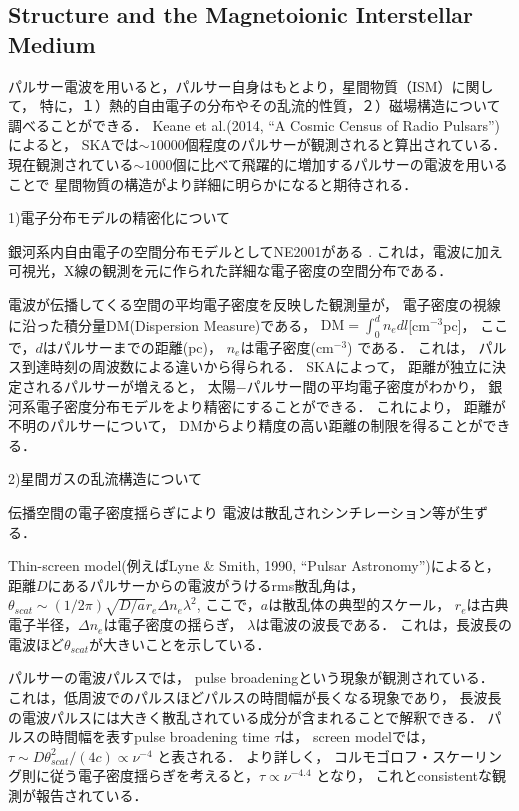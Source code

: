 \subsection{Structure and the Magnetoionic Interstellar Medium}

パルサー電波を用いると，パルサー自身はもとより，星間物質（ISM）に関して，
特に，１）熱的自由電子の分布やその乱流的性質，２）磁場構造について調べることができる．
Keane et al.(2014, ``A Cosmic Census of Radio Pulsars'')によると，
SKAでは$\sim 10000$個程度のパルサーが観測されると算出されている．
現在観測されている$\sim 1000$個に比べて飛躍的に増加するパルサーの電波を用いることで
星間物質の構造がより詳細に明らかになると期待される．

1)電子分布モデルの精密化について

銀河系内自由電子の空間分布モデルとしてNE2001がある
\cite{NE2001}.
これは，電波に加え可視光，X線の観測を元に作られた詳細な電子密度の空間分布である．

電波が伝播してくる空間の平均電子密度を反映した観測量が，
電子密度の視線に沿った積分量DM(Dispersion Measure)である，
$\textrm{DM} = \int_0^d n_e dl$[cm$^{-3}$pc]，
ここで，$d$はパルサーまでの距離(pc)，
$n_e$は電子密度(cm$^{-3}$)
である．
これは，
パルス到達時刻の周波数による違いから得られる．
SKAによって，
距離が独立に決定されるパルサーが増えると，
太陽$-$パルサー間の平均電子密度がわかり，
銀河系電子密度分布モデルをより精密にすることができる．
これにより，
距離が不明のパルサーについて，
DMからより精度の高い距離の制限を得ることができる．

2)星間ガスの乱流構造について

伝播空間の電子密度揺らぎにより
電波は散乱されシンチレーション等が生ずる．

Thin-screen model(例えばLyne \& Smith, 1990, ``Pulsar Astronomy'')によると，
距離$D$にあるパルサーからの電波がうけるrms散乱角は，
$\theta_{scat} \sim (1/2\pi) \sqrt{D/a} r_e \Delta n_e \lambda^2$,
ここで，$a$は散乱体の典型的スケール，
$r_e$は古典電子半径，$\Delta n_e$は電子密度の揺らぎ，
$\lambda$は電波の波長である．
これは，長波長の電波ほど$\theta_{scat}$が大きいことを示している．

パルサーの電波パルスでは，
pulse broadeningという現象が観測されている．
これは，低周波でのパルスほどパルスの時間幅が長くなる現象であり，
長波長の電波パルスには大きく散乱されている成分が含まれることで解釈できる．
パルスの時間幅を表すpulse broadening time $\tau$は，
screen modelでは，
$\tau \sim D \theta_{scat}^2/(4c) \propto \nu^{-4}$
と表される．
より詳しく，
コルモゴロフ・スケーリング則に従う電子密度揺らぎを考えると，$\tau \propto \nu^{-4.4}$
となり，
これとconsistentな観測が報告されている\cite{LMGKA2004}．

